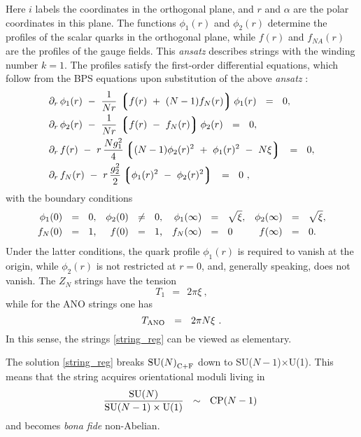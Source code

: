 \documentclass[12pt]{article}
\def\beq{\begin{equation}}
\def\eeq{\end{equation}}
\newcommand{\p}{\partial}
\newcommand{\lgr}{\left\lgroup}
\newcommand{\rgr}{\right\rgroup}
\def\cfl {$\text{SU($N$)}_{\rm C+F}$ }
\begin{document}
	Here $ i $ labels the coordinates in the orthogonal plane, and $ r $ and $ \alpha $
	are the polar coordinates in this plane.
	The functions $ \phi_1(r) $ and $ \phi_2(r) $ determine the profiles of the scalar quarks
	in the orthogonal plane, while $ f(r) $ and $ f_{NA}(r) $ are the profiles of the gauge
	fields. 
	This {\it ansatz} describes strings with the winding number $ k = 1 $.
	The profiles satisfy the first-order differential equations, which follow from the BPS
	equations upon substitution of the above {\it ansatz} \cite{MY,ABEKY}:
\begin{align}
%
\notag
&	\p_r\, \phi_1(r) ~-~ \frac{1}{Nr}\, \lgr f(r) ~+~ (N-1)f_{N}(r) \rgr \phi_1(r) ~~=~~ 0, \\
%
\notag
&	\p_r\, \phi_2(r) ~-~ \frac{1}{Nr}\, \lgr f(r) ~-~ f_{N}(r) \rgr \phi_2(r) ~~=~~ 0 ,\\
%
\label{foes}
&	\p_r\, f(r) ~-~ r\, \frac{N g_1^2}{4} \lgr (N-1)\phi_2(r)^2 ~+~ \phi_1(r)^2 ~-~ N\xi \rgr ~~=~~ 0 , \\
%
\notag
&	\p_r\, f_{N}(r)  ~-~  r\, \frac{g_2^2}{2} \lgr \phi_1(r)^2 ~-~ \phi_2(r)^2 \rgr ~~=~~ 0~,
\end{align}
	with the boundary conditions
\begin{align}
%
\label{boundary}
	\phi_1(0) & ~~=~~  0\text,                   & \phi_2(0) & ~~\neq~~ 0\text,  &
	\phi_1(\infty) & ~~=~~ \sqrt{\xi} \text,     & \phi_2(\infty) & ~~=~~ \sqrt{\xi}\text, \\
%
\notag
	f_{N}(0) & ~~=~~ 1\text,                   & f(0) & ~~=~~ 1\text,   &
	f_{N}(\infty) & ~~=~~ 0 \text\,            &  f(\infty) & ~~=~~ 0\text.
\end{align}
	Under the latter conditions, the quark profile $ \phi_1(r) $ is required to vanish at the origin, while 
	$ \phi_2(r) $ is not restricted at $ r = 0 $, and, generally speaking, does not vanish.
	The $ Z_N $ strings have the tension 
\[
	T_1  ~~=~~ 2\pi\xi~,
\]
	while for the ANO strings one has
\[
	T_{\rm ANO} ~~=~~ 2\pi N \xi~.
\]
	In this sense, the strings \eqref{string_reg} can be viewed as elementary.

	The solution \eqref{string_reg} breaks \cfl down to SU($N-1$)$\times$U(1). 
	This means that the string acquires orientational moduli living in 
\beq
\label{modulispace}
	\frac{\text{SU($N$)}}
            {\text{SU($N-1$)} \times {\rm U(1)}}         ~~\sim~~  \text{CP($N-1$)}~
\eeq
	and becomes {\it bona fide} non-Abelian.
\end{document}
